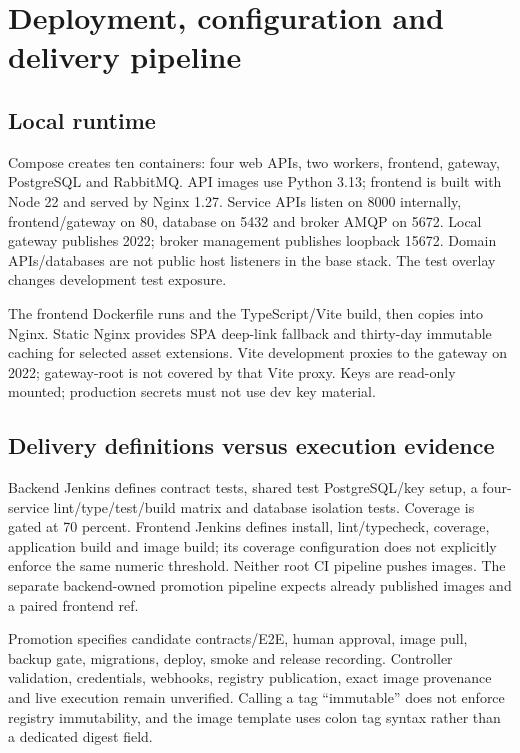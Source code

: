 \documentclass[10pt,a4paper]{article}
\begin{document}
\clearpage
\section{Deployment, configuration and delivery pipeline}
\subsection{Local runtime}
Compose creates ten containers: four web APIs, two workers, frontend, gateway,
PostgreSQL and RabbitMQ. API images use Python 3.13; frontend is built with Node 22
and served by Nginx 1.27. Service APIs listen on 8000 internally, frontend/gateway
on 80, database on 5432 and broker AMQP on 5672. Local gateway publishes 2022;
broker management publishes loopback 15672. Domain APIs/databases are not public
host listeners in the base stack. The test overlay changes development test exposure.

The frontend Dockerfile runs  and the TypeScript/Vite build, then copies
 into Nginx. Static Nginx provides SPA deep-link fallback and thirty-day
immutable caching for selected asset extensions. Vite development proxies 
to the gateway on 2022; gateway-root  is not covered by that Vite proxy.
Keys are read-only mounted; production secrets must not use dev key material.

\subsection{Delivery definitions versus execution evidence}
Backend Jenkins defines contract tests, shared test PostgreSQL/key setup, a
four-service lint/type/test/build matrix and database isolation tests.
Coverage is gated at 70 percent. Frontend Jenkins defines install, lint/typecheck,
coverage, application build and image build; its coverage configuration does not
explicitly enforce the same numeric threshold.
Neither root CI pipeline pushes images. The separate backend-owned promotion
pipeline expects already published images and a paired frontend ref.

Promotion specifies candidate contracts/E2E, human approval, image pull, backup gate,
migrations, deploy, smoke and release recording. Controller validation, credentials,
webhooks, registry publication, exact image provenance and live execution remain
unverified. Calling a tag ``immutable'' does not enforce registry immutability,
and the image template uses colon tag syntax rather than a dedicated digest field.
\end{document}
